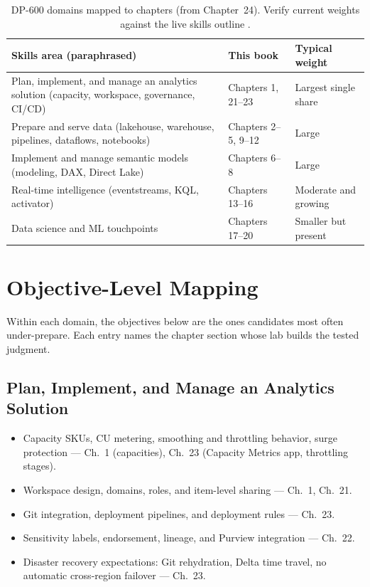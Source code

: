 \begin{table}[H]
\centering
\small
\begin{tabular}{@{}p{5.8cm}p{4.2cm}p{3.6cm}@{}}
\toprule
\textbf{Skills area (paraphrased)} & \textbf{This book} & \textbf{Typical weight} \\
\midrule
Plan, implement, and manage an analytics solution (capacity, workspace, governance, CI/CD) & Chapters 1, 21--23 & Largest single share \\
Prepare and serve data (lakehouse, warehouse, pipelines, dataflows, notebooks) & Chapters 2--5, 9--12 & Large \\
Implement and manage semantic models (modeling, DAX, Direct Lake) & Chapters 6--8 & Large \\
Real-time intelligence (eventstreams, KQL, activator) & Chapters 13--16 & Moderate and growing \\
Data science and ML touchpoints & Chapters 17--20 & Smaller but present \\
\bottomrule
\end{tabular}
\caption{DP-600 domains mapped to chapters (from Chapter~24). Verify current weights against
the live skills outline \cite{microsoftDp600}.}
\label{tab:appendix-e-domains}
\end{table}

\section{Objective-Level Mapping}
%
Within each domain, the objectives below are the ones candidates most often under-prepare.
Each entry names the chapter section whose lab builds the tested judgment.

\subsection{Plan, Implement, and Manage an Analytics Solution}
\begin{itemize}
    \item Capacity SKUs, CU metering, smoothing and throttling behavior, surge protection ---
    Ch.~1 (capacities), Ch.~23 (Capacity Metrics app, throttling stages).
    \item Workspace design, domains, roles, and item-level sharing --- Ch.~1, Ch.~21.
    \item Git integration, deployment pipelines, and deployment rules --- Ch.~23.
    \item Sensitivity labels, endorsement, lineage, and Purview integration --- Ch.~22.
    \item Disaster recovery expectations: Git rehydration, Delta time travel, no automatic
    cross-region failover --- Ch.~23.
\end{itemize}

